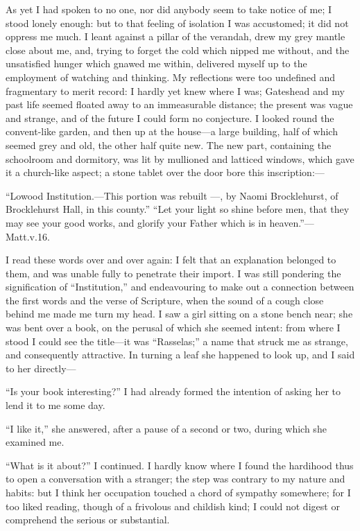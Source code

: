 As yet I had spoken to no one, nor did anybody seem to take notice of
me; I stood lonely enough: but to that feeling of isolation I was
accustomed; it did not oppress me much. I leant against a pillar of the
verandah, drew my grey mantle close about me, and, trying to forget the
cold which nipped me without, and the unsatisfied hunger which gnawed me
within, delivered myself up to the employment of watching and thinking.
My reflections were too undefined and fragmentary to merit record: I
hardly yet knew where I was; Gateshead and my past life seemed floated
away to an immeasurable distance; the present was vague and strange, and
of the future I could form no conjecture. I looked round the
convent-like garden, and then up at the house---a large building, half
of which seemed grey and old, the other half quite new. The new part,
containing the schoolroom and dormitory, was lit by mullioned and
latticed windows, which gave it a church-like aspect; a stone tablet
over the door bore this inscription:---

\enquote{Lowood Institution.---This portion was rebuilt \AD{} ---, by
	Naomi Brocklehurst, of Brocklehurst Hall, in this county.} \enquote{Let
	your light so shine before men, that they may see your good works, and
	glorify your Father which is in heaven.}---\St{} Matt.\@ v.\@ 16.

I read these words over and over again: I felt that an explanation
belonged to them, and was unable fully to penetrate their import. I was
still pondering the signification of \enquote{Institution,} and
endeavouring to make out a connection between the first words and the
verse of Scripture, when the sound of a cough close behind me made me
turn my head. I saw a girl sitting on a stone bench near; she was bent
over a book, on the perusal of which she seemed intent: from where I
stood I could see the title---it was \enquote{Rasselas;} a name that
struck me as strange, and consequently attractive. In turning a leaf
she happened to look up, and I said to her directly---

\enquote{Is your book interesting?} I had already formed the intention
of asking her to lend it to me some day.

\enquote{I like it,} she answered, after a pause of a second or two,
during which she examined me.

\enquote{What is it about?} I continued. I hardly know where I found
the hardihood thus to open a conversation with a stranger; the step was
contrary to my nature and habits: but I think her occupation touched a
chord of sympathy somewhere; for I too liked reading, though of a
frivolous and childish kind; I could not digest or comprehend the
serious or substantial.

